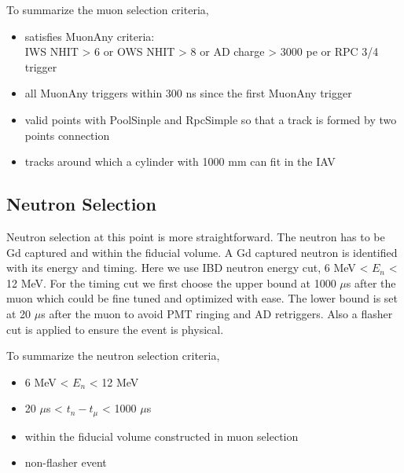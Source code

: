 \documentclass[paper=a4, fontsize=12pt, toc=left]{scrartcl} %
\numberwithin{equation}{section} %
\numberwithin{figure}{section} %
\numberwithin{table}{section} %
\begin{document}
\vspace{\baselineskip}
To summarize the muon selection criteria,
\begin{itemize}
  \item satisfies MuonAny criteria:
        \\IWS NHIT > 6 or OWS NHIT > 8 or AD charge > 3000 pe or RPC 3/4 trigger
  \item all MuonAny triggers within 300 ns since the first MuonAny trigger
  \item valid points with PoolSinple and RpcSimple so that a track is formed by two points connection
  \item tracks around which a cylinder with 1000 mm can fit in the IAV
\end{itemize}

\subsection{Neutron Selection}

Neutron selection at this point is more straightforward. The neutron has to be Gd captured and within the fiducial volume. A Gd captured neutron is identified with its energy and timing. Here we use IBD neutron energy cut, 6 MeV < $E_n$ < 12 MeV. For the timing cut we first choose the upper bound at 1000 $\mu$s after the muon which could be fine tuned and optimized with ease. The lower bound is set at 20 $\mu$s after the muon to avoid PMT ringing and AD retriggers. Also a flasher cut is applied to ensure the event is physical.

\vspace{\baselineskip}
To summarize the neutron selection criteria,
\begin{itemize}
  \item 6 MeV < $E_n$ < 12 MeV
  \item 20 $\mu$s < $t_n-t_\mu$ < 1000 $\mu$s
  \item within the fiducial volume constructed in muon selection
  \item non-flasher event
\end{itemize}
\end{document}
